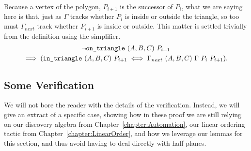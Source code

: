 Because a vertex of the polygon, $P_{i+1}$ is the successor of $P_i$, what we are saying here is that, just as $\Gamma$ tracks whether $P_i$ is inside or outside the triangle, so too must $\Gamma_{next}$ track whether $P_{i+1}$ is inside or outside. This matter is settled trivially from the definition using the simplifier.
\begin{multline}
\neg\texttt{on\_triangle}\ (A,B,C)\ P_{i+1}\\
\implies (\texttt{in\_triangle}\ (A,B,C)\ P_{i+1} \iff \Gamma_{next}\ (A,B,C)\ \Gamma\ P_i\ P_{i+1}).
\end{multline}

\subsection{Some Verification}
We will not bore the reader with the details of the verification. Instead, we will give an extract of a specific case, showing how in these proof we are still relying on our discovery algebra from Chapter~\ref{chapter:Automation}, our linear ordering tactic from Chapter~\ref{chapter:LinearOrder}, and how we leverage our lemmas for this section, and thus avoid having to deal directly with half-planes.

